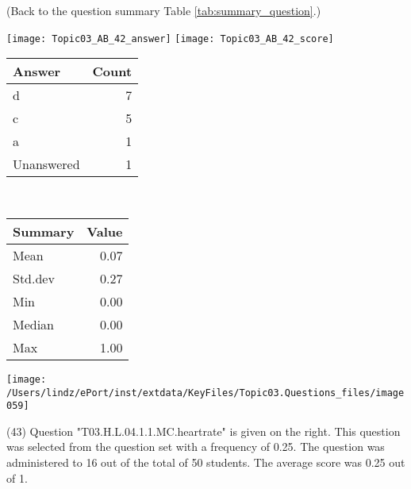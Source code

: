 \documentclass[12pt,english,nohyper]{tufte-handout}\usepackage[]{graphicx}\usepackage[]{color}
\begin{document}
 (Back to the question summary Table \ref{tab:summary_question}.)

\begin{center} \texttt{[image: Topic03\_AB\_42\_answer]} \texttt{[image: Topic03\_AB\_42\_score]} \end{center} 

\begin{center}%
\begin{tabular}{lr}
  \hline
Answer & Count \\ 
  \hline
d &   7 \\ 
  c &   5 \\ 
  a &   1 \\ 
  Unanswered &   1 \\ 
   \hline
\end{tabular}
~~~~~~~~%
\begin{tabular}{lr}
  \hline
Summary & Value \\ 
  \hline
Mean & 0.07 \\ 
  Std.dev & 0.27 \\ 
  Min & 0.00 \\ 
  Median & 0.00 \\ 
  Max & 1.00 \\ 
   \hline
\end{tabular}
\end{center}\newpage{}



\vspace{5cm}\begin{marginfigure}\texttt{[image: /Users/lindz/ePort/inst/extdata/KeyFiles/Topic03.Questions\_files/image059]}\end{marginfigure}\vspace{-5cm} (43) Question "T03.H.L.04.1.1.MC.heartrate" is given on the right. This question was selected from the question set with a frequency of 0.25. The question was administered to 16 out of the total of 50 students. The average score was 0.25 out of 1.
\end{document}

